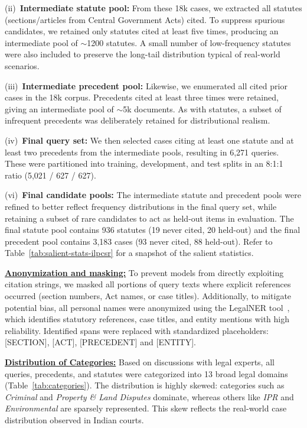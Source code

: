 \noindent (ii)~\textbf{Intermediate statute pool:} From these 18k cases, we extracted all statutes (sections/articles from Central Government Acts) cited. To suppress spurious candidates, we retained only statutes cited at least five times, producing an intermediate pool of $\sim$1200 statutes. A small number of low-frequency statutes were also included to preserve the long-tail distribution typical of real-world scenarios.  

\noindent (iii)~\textbf{Intermediate precedent pool:} Likewise, we enumerated all cited prior cases in the 18k corpus. Precedents cited at least three times were retained, giving an intermediate pool of $\sim$5k documents. As with statutes, a subset of infrequent precedents was deliberately retained for distributional realism.  

\noindent (iv)~\textbf{Final query set:} We then selected cases citing at least one statute and at least two precedents from the intermediate pools, resulting in 6,271 queries. These were partitioned into training, development, and test splits in an 8:1:1 ratio (5,021 / 627 / 627).  

\noindent (vi)~\textbf{Final candidate pools:} The intermediate statute and precedent pools were refined to better reflect frequency distributions in the final query set, while retaining a subset of rare candidates to act as held-out items in evaluation. The final statute pool contains 936 statutes (19 never cited, 20 held-out) and the final precedent pool contains 3,183 cases (93 never cited, 88 held-out). Refer to Table~\ref{tab:salient-stats-ilpcsr} for a snapshot of the salient statistics. 

\vspace{1mm}
\noindent \underline{\textbf{Anonymization and masking:}} To prevent models from directly exploiting citation strings, we masked all portions of query texts where explicit references occurred (section numbers, Act names, or case titles). Additionally, to mitigate potential bias, all personal names were anonymized using the LegalNER tool~\citep{kalamkar2022legalner}, which identifies statutory references, case titles, and entity mentions with high reliability. Identified spans were replaced with standardized placeholders: [SECTION], [ACT], [PRECEDENT] and [ENTITY].  

\vspace{1mm}
\noindent\underline{\bf Distribution of Categories:}
Based on discussions with legal experts, all queries, precedents, and statutes were categorized into 13 broad legal domains (Table~\ref{tab:categories}). The distribution is highly skewed: categories such as \textit{Criminal} and \textit{Property \& Land Disputes} dominate, whereas others like \textit{IPR} and \textit{Environmental} are sparsely represented. This skew reflects the real-world case distribution observed in Indian courts.

